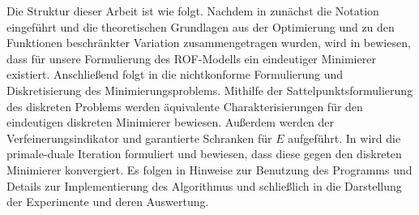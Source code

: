 Die Struktur dieser Arbeit ist wie folgt.
Nachdem in  zunächst die Notation eingeführt und
die theoretischen Grundlagen aus der Optimierung und zu den Funktionen
beschränkter Variation zusammengetragen wurden, wird in
 bewiesen, dass für unsere Formulierung des
ROF-Modells ein eindeutiger Minimierer existiert.
Anschließend folgt in  die nichtkonforme
Formulierung und Diskretisierung des Minimierungsproblems. 
Mithilfe der Sattelpunktsformulierung des diskreten Problems werden äquivalente
Charakterisierungen für den eindeutigen diskreten Minimierer bewiesen. 
Außerdem werden der Verfeinerungsindikator und garantierte Schranken für $E$
aufgeführt.
In  wird die primale-duale Iteration formuliert und
bewiesen, dass diese gegen den diskreten Minimierer konvergiert. 
Es folgen in  Hinweise zur Benutzung des Programms
und Details zur Implementierung des Algorithmus und schließlich in
 die Darstellung der Experimente und deren Auswertung.


